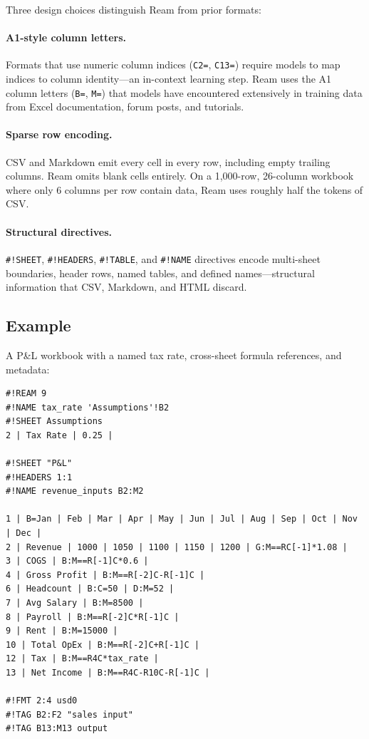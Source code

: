 \documentclass[11pt]{article}
\begin{document}
Three design choices distinguish Ream from prior formats:

\paragraph{A1-style column letters.}
Formats that use numeric column indices (\texttt{C2=}, \texttt{C13=}) require models to map indices to column identity---an in-context learning step.
Ream uses the A1 column letters (\texttt{B=}, \texttt{M=}) that models have encountered extensively in training data from Excel documentation, forum posts, and tutorials.

\paragraph{Sparse row encoding.}
CSV and Markdown emit every cell in every row, including empty trailing columns.
Ream omits blank cells entirely.
On a 1,000-row, 26-column workbook where only 6 columns per row contain data, Ream uses roughly half the tokens of CSV.

\paragraph{Structural directives.}
\texttt{\#!SHEET}, \texttt{\#!HEADERS}, \texttt{\#!TABLE}, and \texttt{\#!NAME} directives encode multi-sheet boundaries, header rows, named tables, and defined names---structural information that CSV, Markdown, and HTML discard.

\subsection{Example}

A P\&L workbook with a named tax rate, cross-sheet formula references, and metadata:

\begin{lstlisting}
#!REAM 9
#!NAME tax_rate 'Assumptions'!B2
#!SHEET Assumptions
2 | Tax Rate | 0.25 |

#!SHEET "P&L"
#!HEADERS 1:1
#!NAME revenue_inputs B2:M2

1 | B=Jan | Feb | Mar | Apr | May | Jun | Jul | Aug | Sep | Oct | Nov | Dec |
2 | Revenue | 1000 | 1050 | 1100 | 1150 | 1200 | G:M==RC[-1]*1.08 |
3 | COGS | B:M==R[-1]C*0.6 |
4 | Gross Profit | B:M==R[-2]C-R[-1]C |
6 | Headcount | B:C=50 | D:M=52 |
7 | Avg Salary | B:M=8500 |
8 | Payroll | B:M==R[-2]C*R[-1]C |
9 | Rent | B:M=15000 |
10 | Total OpEx | B:M==R[-2]C+R[-1]C |
12 | Tax | B:M==R4C*tax_rate |
13 | Net Income | B:M==R4C-R10C-R[-1]C |

#!FMT 2:4 usd0
#!TAG B2:F2 "sales input"
#!TAG B13:M13 output
\end{lstlisting}
\end{document}
